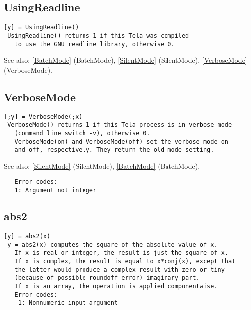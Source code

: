 \documentclass[a4paper]{article}
\begin{document}
\subsection{UsingReadline\label{UsingReadline}}

\begin{tscreen}
\begin{verbatim}
[y] = UsingReadline()
 UsingReadline() returns 1 if this Tela was compiled
   to use the GNU readline library, otherwise 0.
\end{verbatim}

See also: \ref{BatchMode} {(BatchMode)}, \ref{SilentMode} {(SilentMode)}, \ref{VerboseMode} {(VerboseMode)}.
\end{tscreen}



\subsection{VerboseMode\label{VerboseMode}}

\begin{tscreen}
\begin{verbatim}
[;y] = VerboseMode(;x)
 VerboseMode() returns 1 if this Tela process is in verbose mode
   (command line switch -v), otherwise 0.
   VerboseMode(on) and VerboseMode(off) set the verbose mode on
   and off, respectively. They return the old mode setting.
\end{verbatim}

See also: \ref{SilentMode} {(SilentMode)}, \ref{BatchMode} {(BatchMode)}.
\begin{verbatim}
   Error codes:
   1: Argument not integer 
\end{verbatim}
\end{tscreen}



\subsection{abs2\label{abs2}}

\begin{tscreen}
\begin{verbatim}
[y] = abs2(x)
 y = abs2(x) computes the square of the absolute value of x.
   If x is real or integer, the result is just the square of x.
   If x is complex, the result is equal to x*conj(x), except that
   the latter would produce a complex result with zero or tiny
   (because of possible roundoff error) imaginary part.
   If x is an array, the operation is applied componentwise.
   Error codes:
   -1: Nonnumeric input argument 
\end{verbatim}
\end{tscreen}
\end{document}
